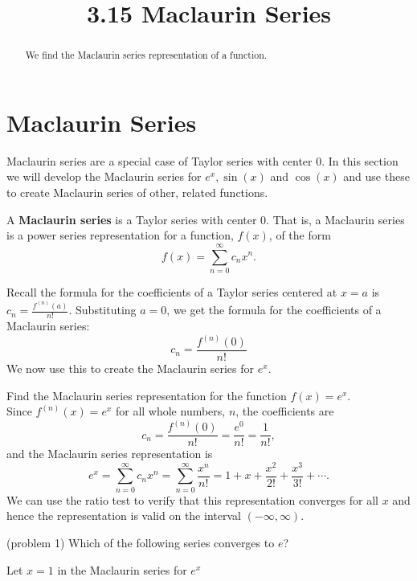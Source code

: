 \documentclass[handout]{ximera}
\title{3.15 Maclaurin Series}
\begin{document}
\begin{abstract}
We find the Maclaurin series representation of a function.
\end{abstract}

\maketitle

\section{Maclaurin Series}


Maclaurin series are a special case of Taylor series with center $0$. In this section we will develop the Maclaurin series for 
$e^x, \sin(x)$ and $\cos(x)$ and use these to create Maclaurin series of other, related functions.

\begin{definition} 
A \textbf{Maclaurin series} is a Taylor series with center 0. That is, a Maclaurin series is a power series representation 
for a function, $f(x)$, of the form
\[
f(x) = \sum_{n=0}^\infty c_n x^n.
\]
\end{definition}
 
Recall the formula for the coefficients of a Taylor series centered at $x = a$ is $\displaystyle c_n = \frac{f^{(n)}(a)}{n!}$.
Substituting $a = 0$, we get the formula for the coefficients of a Maclaurin series:
\[
c_n = \frac{f^{(n)}(0)}{n!}
\]
We now use this to create the Maclaurin series for $e^x$.
\begin{example} 
Find the Maclaurin series representation for the function $f(x) = e^x$.\\
Since $f^{(n)}(x) = e^x$ for all whole numbers, $n$, the coefficients are
\[
c_n = \frac{f^{(n)}(0)}{n!} = \frac{e^0}{n!} = \frac{1}{n!},
\]
and the Maclaurin series representation is 
\[
e^x = \sum_{n=0}^\infty c_n x^n = \sum_{n=0}^\infty \frac{x^n}{n!} = 1 + x + \frac{x^2}{2!} + \frac{x^3}{3!} + \cdots.
\]
We can use the ratio test to verify that this representation converges for all $x$ and 
hence the representation is valid on the interval $(-\infty, \infty)$.
\end{example}

\begin{problem}(problem 1)
Which of the following series converges to $e$?
\begin{hint}
Let $x = 1$ in the Maclaurin series for $e^x$
\end{hint}

\begin{multipleChoice}
\end{multipleChoice}
\end{problem}
\end{document}
